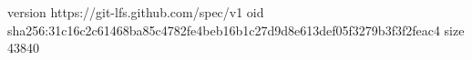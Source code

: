 version https://git-lfs.github.com/spec/v1
oid sha256:31c16c2c61468ba85c4782fe4beb16b1c27d9d8e613def05f3279b3f3f2feac4
size 43840
